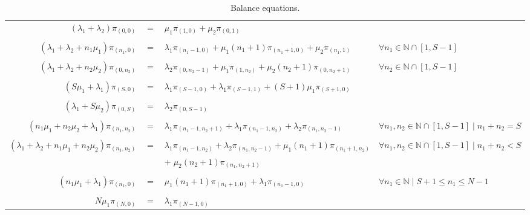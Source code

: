 \documentclass[10pt,a4paper]{article}
\begin{document}
\begin{table}[h!]
    \caption{Balance equations.}
    \centering
    \small
    \begin{adjustbox}{center=\textwidth}
    \label{table:ALG2-CloudletBalanceEquationList}
     \begin{tabular}{rcll}

      \toprule

      $(\lambda_1 + \lambda_2)\pi_{(0,0)}$ & $=$ & $\mu_1\pi_{(1,0)} + \mu_2\pi_{(0,1)}$ \\\\
       
      $(\lambda_1 + \lambda_2 + n_1\mu_1)\pi_{(n_1,0)} $ & $=$ & $ \lambda_1\pi_{(n_1-1,0)} + \mu_1(n_1+1)\pi_{(n_1+1,0)} + \mu_2\pi_{(n_1,1)}$ & $\forall n_1 \in \mathbb{N} \cap [1, S-1]$ \\\\
      
      $(\lambda_1 + \lambda_2 + n_2\mu_2)\pi_{(0,n_2)} $ & $=$ & $ \lambda_2\pi_{(0,n_2-1)} + \mu_1\pi_{(1,n_2)} + \mu_2(n_2+1)\pi_{(0,n_2+1)}$ & $ \forall n_2 \in \mathbb{N} \cap [1, S-1]$ \\\\
      
      $(S\mu_1+\lambda_1)\pi_{(S,0)}$ & $=$ & $\lambda_1\pi_{(S-1,0)} + \lambda_1\pi_{(S-1,1)} + (S+1)\mu_1 \pi_{(S+1,0)}$ \\\\
      
      $(\lambda_1 + S\mu_2) \pi_{(0,S)}$ & $=$ & $\lambda_2\pi_{(0,S-1)}$ \\\\
      
      $(n_1\mu_1 + n_2\mu_2 + \lambda_1)\pi_{(n_1,n_2)} $ & $=$ & $ \lambda_1\pi_{(n_1-1,n_2+1)} + \lambda_1\pi_{(n_1-1,n_2)} + \lambda_2\pi_{(n_1,n_2-1)}$ & $\forall n_1,n_2 \in \mathbb{N} \cap [1, S-1] \mid n_1 + n_2 = S $ \\\\
      
      $(\lambda_1 + \lambda_2 + n_1\mu_1 + n_2\mu_2)\pi_{(n_1,n_2)} $ & $=$ & $ \lambda_1\pi_{(n_1-1,n_2)} + \lambda_2\pi_{(n_1,n_2-1)} + \mu_1(n_1+1)\pi_{(n_1+1,n_2)} $ & $\forall n_1,n_2 \in \mathbb{N} \cap [1, S-1] \mid n_1 + n_2 < S$\\
      && $+\; \mu_2(n_2+1)\pi_{(n_1,n_2+1)}$ & \\\\
      
      $(n_1\mu_1 + \lambda_1)\pi_{(n_1,0)}$ & = & $\mu_1(n_1+1)\pi_{(n_1+1,0)} + \lambda_1\pi_{(n_1-1,0)}$ & $\forall n_1 \in \mathbb{N} \mid S+1 \leq n_1 \leq N-1$ \\\\

      $N\mu_1\pi_{(N,0)}$ & = & $\lambda_1\pi_{(N-1,0)}$ \\
      
      \bottomrule

    \end{tabular}
    \end{adjustbox}
\end{table}
\end{document}
